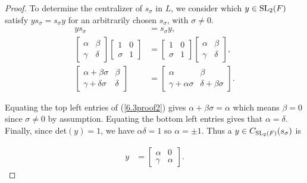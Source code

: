 \begin{proof}
    \leanok
To determine the centralizer of $s_\sigma$ in $L$, we consider which $y \in \operatorname{SL}_2(F)$satisfy $y s_\sigma = s_\sigma y$ for an arbitrarily chosen $s_\sigma$, with $\sigma \neq 0$. \\
\vspace{-0.5mm}
\begin{align}\label{6.3proof2} y s_\sigma &= s_\sigma y, \nonumber \\[1.5ex]
\begin{bmatrix} \alpha & \beta \\ \gamma & \delta \end{bmatrix} \begin{bmatrix} 1 & 0 \\ \sigma & 1 \end{bmatrix} &= \begin{bmatrix} 1 & 0 \\ \sigma & 1 \end{bmatrix} \begin{bmatrix} \alpha & \beta \\ \gamma & \delta \end{bmatrix}, \nonumber \\[1.5ex]
\begin{bmatrix} \alpha + \beta \sigma & \beta \\ \gamma + \delta \sigma & \delta \end{bmatrix} &= \begin{bmatrix} \alpha & \beta \\ \gamma +  \alpha \sigma & \delta + \beta \sigma \end{bmatrix}.
\end{align}
\vspace{.5mm}

Equating the top left entries of (\ref{6.3proof2}) gives $\alpha + \beta \sigma = \alpha$ which means $\beta = 0$ since $\sigma \neq 0$ by assumption. Equating the bottom left entries gives that $\alpha = \delta$. Finally, since det$(y) = 1$, we have $\alpha \delta = 1$ so $\alpha = \pm 1$. Thus a $y \in C_{\operatorname{SL}_2(F)}(s_\sigma)$ is

\begin{align*} y &= \begin{bmatrix} \alpha & 0 \\ \gamma & \alpha \end{bmatrix}. \tag{where $\alpha = \pm 1$}
\end{align*}


\end{proof}
